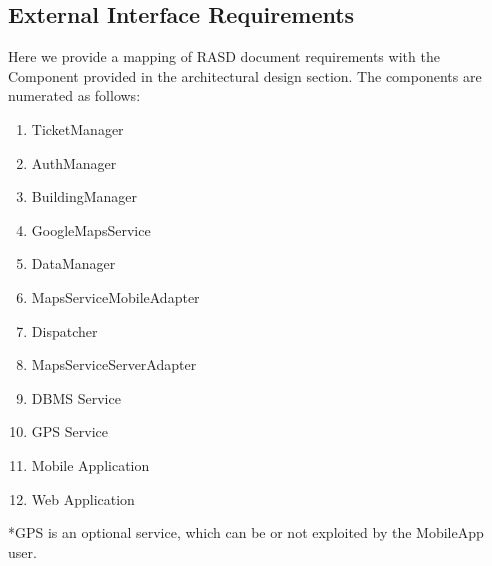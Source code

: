 	\subsection {External Interface Requirements}
	Here we provide a mapping of RASD document requirements with the Component provided in the architectural design section. The components are numerated as follows:
	\renewcommand{\theenumi}{[C\,\arabic{enumi}]}
	\begin{enumerate}
	\item TicketManager
	\item AuthManager
	\item BuildingManager
	\item GoogleMapsService
	\item DataManager
	\item MapsServiceMobileAdapter
	\item Dispatcher
	\item MapsServiceServerAdapter
	\item DBMS Service
	\item GPS Service
	\item Mobile Application
	\item Web Application
	\end{enumerate}
*GPS is an optional service, which can be or not exploited by the MobileApp user.
\newpage

